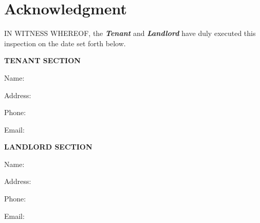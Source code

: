 
\section*{Acknowledgment}
\label{sec:signature}

IN WITNESS WHEREOF, the \textit{\textbf{Tenant}} and \textit{\textbf{Landlord}} have duly executed this inspection on the date set forth below.


\vspace{0.5in}

\hspace{3in}
\textbf{TENANT SECTION}

\vspace{0.2in}
\hspace{3in}
Name: \TenantName{}

\vspace{0.2in}

\hspace{3in}
\parbox{3.5in}{
Address: \TenantAddress{}
}
\vspace{0.2in}

\hspace{3in}
Phone: \TenantPhone{}

\vspace{0.2in}

\hspace{3in}
Email: \TenantEmail{}


\vspace{0.5in}

\hspace{3in}
\textbf{LANDLORD SECTION}

\vspace{0.2in}
\hspace{3in}
Name: \LandlordName{}

\vspace{0.2in}

\hspace{3in}
\parbox{3.5in}{
Address: \LandlordAddress{}
}
\vspace{0.2in}

\hspace{3in}
Phone: \LandlordPhone{}

\vspace{0.2in}

\hspace{3in}
Email: \LandlordEmail{}

